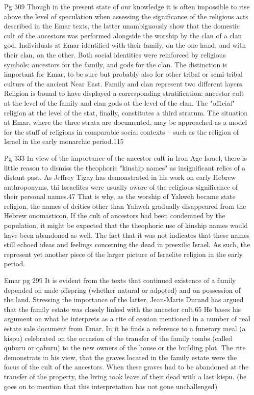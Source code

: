 \documentclass[11pt]{article}
\begin{document}
{Pg 309 Though in the present state of our knowledge it is often impossible to rise above the level of speculation when assessing the significance of the religious acts described in the Emar texts, the latter unambiguously show that the domestic cult of the ancestors was performed alongside the worship by the clan of a clan god. Individuals at Emar identified with their family, on the one hand, and with their clan, on the other. Both social identities were reinforced by religious symbols: ancestors for the family, and gods for the clan. The distinction is important for Emar, to be sure but probably also for other tribal or semi-tribal culturs of the ancient Near East. Family and clan represent two different layers. Religion is bound to have displayed a corresponding stratification: ancestor cult at the level of the family and clan gods at the level of the clan. The "official" religion at the level of the stat, finally, constitutes a third stratum. The situation at Emar, where the three strata are documented, may be approached as a model for the stuff of religions in comparable social contexts -- such as the religion of Israel in the early monarchic period.115


Pg 333 In view of the importance of the ancestor cult in Iron Age Israel, there is little reason to dismiss the theophoric "kinship names" as insignificant relics of a distant past. As Jeffrey Tigay has demonstrated in his work on early Hebrew anthroponyms, thi Israelites were usually aware of the religious significance of their personal names.47 That is why, as the worship of Yahweh became state religion, the names of deities other than Yahweh gradually disappeared from the Hebrew onomasticon. If the cult of ancestors had been condemned by the population, it might be expected that the theophoric use of kinship names would have been abandoned as well. The fact that it was not indicates that these names still echoed ideas and feelings concerning the dead in preexilic Israel. As such, the represent yet another piece of the larger picture of Israelite religion in the early period. 

Emar
pg 299 It is evident from the texts that continued existence of a family depended on male offspring (whether natural or adpoted) and on possession of the land. Stressing the importance of the latter, Jean-Marie Durand has argued that the family estate was closely linked with the ancestor cult.65 He bases his argument on what he interprets as a rite of cession mentioned in a number of real estate sale document from Emar. In it he finds a reference to a funerary meal (a kispu) celebrated on the occasion of the transfer of the family tombs (called quburu or qaburu) to the new owners of the house or the building plot. The rite demonstrats in his view, that the graves located in the family estate were the focus of the cult of the ancestors. When these graves had to be abandoned at the transfer of the property, the living took leave of their dead with a last kispu. (he goes on to mention that this interpretation has not gone unchallenged)

}
\end{document}
